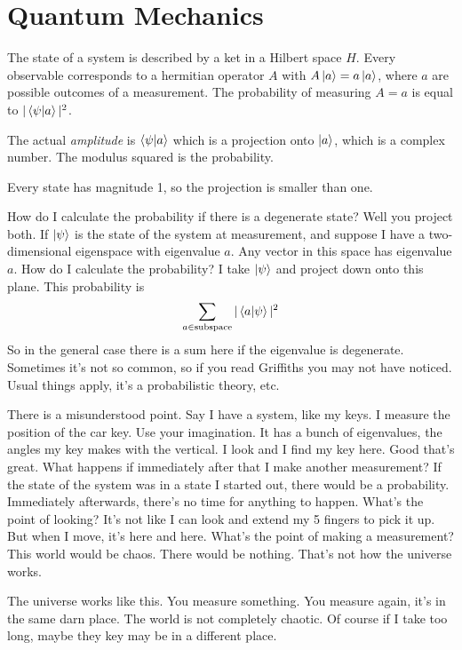 \section{Quantum Mechanics}
The state of a system is described by a ket in a Hilbert space $H$.
Every observable corresponds to a hermitian operator $A$ with
$A\ket{a}=a\ket{a}$,
where $a$ are possible outcomes of a measurement.
The probability of measuring $A=a$ is equal to
$|\braket{\psi}{a}|^2$.

The actual \emph{amplitude} is $\braket{\psi}{a}$ which is a projection onto
$\ket{a}$,
which is a complex number.
The modulus squared is the probability.

Every state has magnitude 1,
so the projection is smaller than one.

How do I calculate the probability if there is a degenerate state?
Well you project both.
If $\ket{\psi}$ is the state of the system at measurement,
and suppose I have a two-dimensional eigenspace with eigenvalue $a$.
Any vector in this space has eigenvalue $a$.
How do I calculate the probability?
I take $\ket{\psi}$ and project down onto this plane.
This probability is
\begin{align}
    \sum_{a\in\text{subspace}} |\braket{a}{\psi}|^2
\end{align}
So in the general case there is a sum here if the eigenvalue is degenerate.
Sometimes it's not so common,
so if you read Griffiths you may not have noticed.
Usual things apply,
it's a probabilistic theory, etc.


There is a misunderstood point.
Say I have a system, like my keys.
I measure the position of the car key.
Use your imagination.
It has a bunch of eigenvalues,
the angles my key makes with the vertical.
I look and I find my key here.
Good that's great.
What happens if immediately after that I make another measurement?
If the state of the system was in a state I started out,
there would be a probability.
Immediately afterwards,
there's no time for anything to happen.
What's the point of looking?
It's not like I can look and extend my 5 fingers to pick it up.
But when I move,
it's here and here.
What's the point of making a measurement?
This world would be chaos.
There would be nothing.
That's not how the universe works.

The universe works like this.
You measure something.
You measure again,
it's in the same darn place.
The world is not completely chaotic.
Of course if I take too long,
maybe they key may be in a different place.

